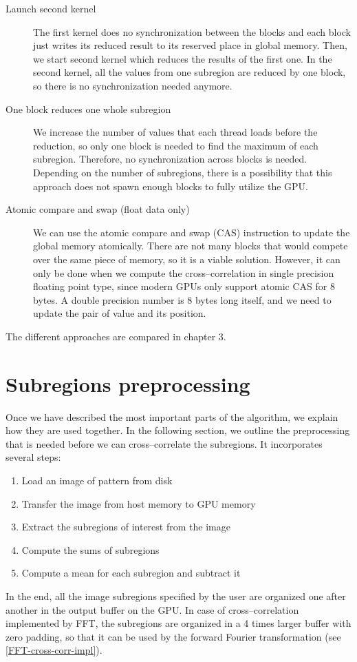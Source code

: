 \begin{description}
	\item[Launch second kernel] The first kernel does no synchronization between the blocks and each block just writes its reduced result to its reserved place in global memory. Then, we start second kernel which reduces the results of the first one. In the second kernel, all the values from one subregion are reduced by one block, so there is no synchronization needed anymore. 
	\item[One block reduces one whole subregion] We increase the number of values that each thread loads before the reduction, so only one block is needed to find the maximum of each subregion. Therefore, no synchronization across blocks is needed. Depending on the number of subregions, there is a possibility that this approach does not spawn enough blocks to fully utilize the GPU.
	\item[Atomic compare and swap (float data only)] We can use the atomic compare and swap (CAS) instruction to update the global memory atomically. There are not many blocks that would compete over the same piece of memory, so it is a viable solution. However, it can only be done when we compute the cross--correlation in single precision floating point type, since modern GPUs only support atomic CAS for 8 bytes. A double precision number is 8 bytes long itself, and we need to update the pair of value and its position. 
\end{description}

The different approaches are compared in chapter 3.



\section{Subregions preprocessing}
\label{preprocessing}
Once we have described the most important parts of the algorithm, we explain how they are used together. In the following section, we outline the preprocessing that is needed before we can cross--correlate the subregions. It incorporates several steps:
\begin{enumerate}
	\item Load an image of pattern from disk
	\item Transfer the image from host memory to GPU memory
	\item Extract the subregions of interest from the image
	\item Compute the sums of subregions
	\item Compute a mean for each subregion and subtract it
\end{enumerate}
In the end, all the image subregions specified by the user are organized one after another in the output buffer on the GPU. In case of cross--correlation implemented by FFT, the subregions are organized in a 4 times larger buffer with zero padding, so that it can be used by the forward Fourier transformation (see \cref{FFT-cross-corr-impl}).

